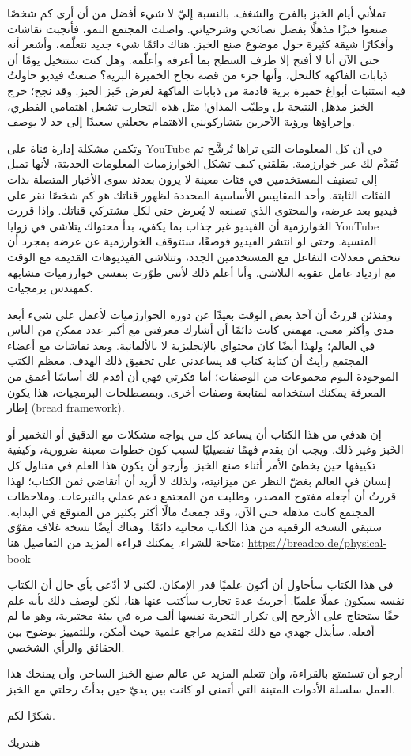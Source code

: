 تملأني أيام الخبز بالفرح والشغف. بالنسبة إليّ لا شيء أفضل من أن أرى كم
شخصًا صنعوا خبزًا مذهلًا بفضل نصائحي وشرحياتي. واصلت المجتمع النمو،
فأنجبت نقاشات وأفكارًا شيقة كثيرة حول موضوع صنع الخبز. هناك دائمًا شيء
جديد نتعلّمه، وأشعر أنه حتى الآن أنا لا أفتح إلا طرف السطح بما أعرفه
وأعلّمه. وهل كنت ستتخيل يومًا أن ذبابات الفاكهة كالنحل، وأنها جزء من
قصة نجاح الخميرة البرية؟ صنعتُ فيديو حاولتُ فيه استنبات أبواغ خميرة
برية قادمة من ذبابات الفاكهة لغرض خَبز الخبز. وقد نجح؛ خرج الخبز مذهل
النتيجة بل وطيّب المذاق! مثل هذه التجارب تشعل اهتمامي الفطري، وإجراؤها
ورؤية الآخرين يتشاركونني الاهتمام يجعلني سعيدًا إلى حد لا يوصف.

وتكمن مشكلة إدارة قناة على \textenglish{YouTube} في أن كل المعلومات
التي تراها تُرشَّح ثم تُقدَّم لك عبر خوارزمية. يقلقني كيف تشكل
الخوارزميات المعلومات الحديثة، لأنها تميل إلى تصنيف المستخدمين في فئات
معينة لا يرون بعدئذ سوى الأخبار المتصلة بذات الفئات الثابتة. وأحد
المقاييس الأساسية المحددة لظهور قناتك هو كم شخصًا نقر على فيديو بعد
عرضه، والمحتوى الذي تصنعه لا يُعرض حتى لكل مشتركي قناتك. وإذا قررت
الخوارزمية أن الفيديو غير جذاب بما يكفي، بدأ محتواك يتلاشى في زوايا
\textenglish{YouTube} المنسية. وحتى لو انتشر الفيديو فوضعًا، ستتوقف
الخوارزمية عن عرضه بمجرد أن تنخفض معدلات التفاعل مع المستخدمين الجدد،
وتتلاشى الفيديوهات القديمة مع الوقت مع ازدياد عامل عقوبة التلاشي. وأنا
أعلم ذلك لأنني طوّرت بنفسي خوارزميات مشابهة كمهندس برمجيات.

ومنذئن قررتُ أن آخذ بعض الوقت بعيدًا عن دورة الخوارزميات لأعمل على شيء
أبعد مدى وأكثر معنى. مهمتي كانت دائمًا أن أشارك معرفتي مع أكبر عدد
ممكن من الناس في العالم؛ ولهذا أيضًا كان محتواي بالإنجليزية لا
بالألمانية. وبعد نقاشات مع أعضاء المجتمع رأيتُ أن كتابة كتاب قد يساعدني
على تحقيق ذلك الهدف. معظم الكتب الموجودة اليوم مجموعات من الوصفات؛ أما
فكرتي فهي أن أقدم لك أساسًا أعمق من المعرفة يمكنك استخدامه لمتابعة
وصفات أخرى. وبمصطلحات البرمجيات، هذا يكون إطار
\textenglish{(bread framework)}.

إن هدفي من هذا الكتاب أن يساعد كل من يواجه مشكلات مع الدقيق أو التخمير
أو الخَبز وغير ذلك. ويجب أن يقدم فهمًا تفصيليًا لسبب كون خطوات معينة
ضرورية، وكيفية تكييفها حين يخطئ الأمر أثناء صنع الخبز. وأرجو أن يكون
هذا العلم في متناول كل إنسان في العالم بغضّ النظر عن ميزانيته، ولذلك لا
أريد أن أتقاضى ثمن الكتاب؛ لهذا قررتُ أن أجعله مفتوح المصدر، وطلبت من
المجتمع دعم عملي بالتبرعات. وملاحظات المجتمع كانت مذهلة حتى الآن، وقد
جمعتُ مالًا أكثر بكثير من المتوقع في البداية. ستبقى النسخة الرقمية من
هذا الكتاب مجانية دائمًا. وهناك أيضًا نسخة غلاف مقوّى متاحة للشراء.
يمكنك قراءة المزيد من التفاصيل هنا:
\url{https://breadco.de/physical-book}

في هذا الكتاب سأحاول أن أكون علميًا قدر الإمكان. لكني لا أدّعي بأي حال
أن الكتاب نفسه سيكون عملًا علميًا. أجريتُ عدة تجارب سأكتب عنها هنا،
لكن لوصف ذلك بأنه علم حقًا ستحتاج على الأرجح إلى تكرار التجربة نفسها
ألف مرة في بيئة مختبرية، وهو ما لم أفعله. سأبذل جهدي مع ذلك لتقديم
مراجع علمية حيث أمكن، وللتمييز بوضوح بين الحقائق والرأي الشخصي.

أرجو أن تستمتع بالقراءة، وأن تتعلم المزيد عن عالم صنع الخبز الساحر،
وأن يمنحك هذا العمل سلسلة الأدوات المتينة التي أتمنى لو كانت بين يديّ
حين بدأتُ رحلتي مع الخبز.

شكرًا لكم.

هندريك
